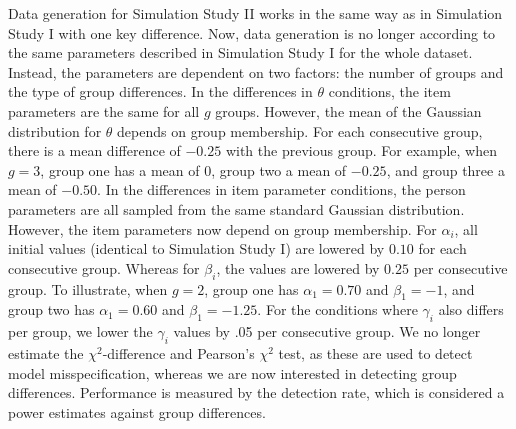 \documentclass[Royal,sageapa,times,doublespace]{sagej}
\begin{document}
\indent Data generation for Simulation Study II works in the same way as in Simulation Study I with one key difference. Now, data generation is no longer according to the same parameters described in Simulation Study I for the whole dataset. Instead, the parameters are dependent on two factors: the number of groups and the type of group differences. In the differences in $\theta$ conditions, the item parameters are the same for all $g$ groups. However, the mean of the Gaussian distribution for $\theta$ depends on group membership. For each consecutive group, there is a mean difference of $-0.25$ with the previous group. For example, when $g = 3$, group one has a mean of 0, group two a mean of $-0.25$, and group three a mean of $-0.50$. In the differences in item parameter conditions, the person parameters are all sampled from the same standard Gaussian distribution. However, the item parameters now depend on group membership. For $\alpha_i$, all initial values (identical to Simulation Study I) are lowered by $0.10$ for each consecutive group. Whereas for $\beta_i$, the values are lowered by $0.25$ per consecutive group. To illustrate, when $g = 2$, group one has $\alpha_1 = 0.70$ and $\beta_1 = -1$, and group two has $\alpha_1 = 0.60$ and $\beta_1 = -1.25$. For the conditions where $\gamma_i$ also differs per group, we lower the $\gamma_i$ values by .05 per consecutive group. We no longer estimate the $\chi^2$-difference and Pearson's $\chi^2$ test, as these are used to detect model misspecification, whereas we are now interested in detecting group differences. Performance is measured by the detection rate, which is considered a power estimates against group differences. \\
\end{document}
